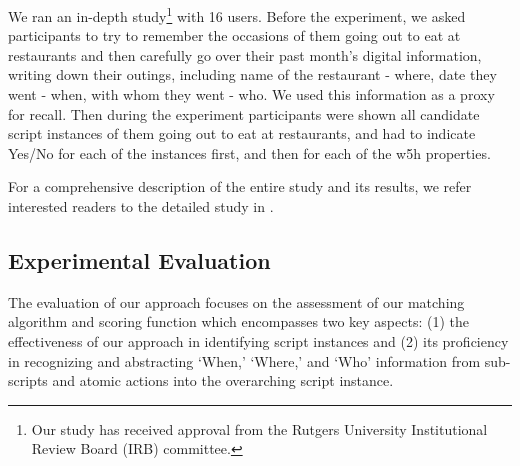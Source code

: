 \documentclass[11pt]{article}
\begin{document}
We ran an in-depth study\footnote{Our study has received approval from the Rutgers University Institutional Review Board (IRB) committee.}  with 16 users. Before the experiment, we asked participants to try to remember the occasions of them going out to eat at restaurants and then carefully go over their past month's digital information, writing down their outings, including name of the restaurant - where, date they went - when,
with whom they went - who. We used this information as a proxy for recall.
Then during the experiment participants were shown all candidate script instances of them going out to eat at restaurants, and had to indicate Yes/No for each of the instances first, and then for each of the w5h properties.

For a comprehensive description of the entire study and its results, we refer interested readers to the detailed study in \cite{kalokyri2022supporting}. 



\subsection{Experimental Evaluation}
 The evaluation of our approach focuses on the assessment of our matching algorithm and scoring function which encompasses two key aspects: (1) the effectiveness of our approach in identifying script instances and (2) its proficiency in recognizing and abstracting `When,' `Where,' and `Who' information from sub-scripts and atomic actions into the overarching script instance.
\end{document}
